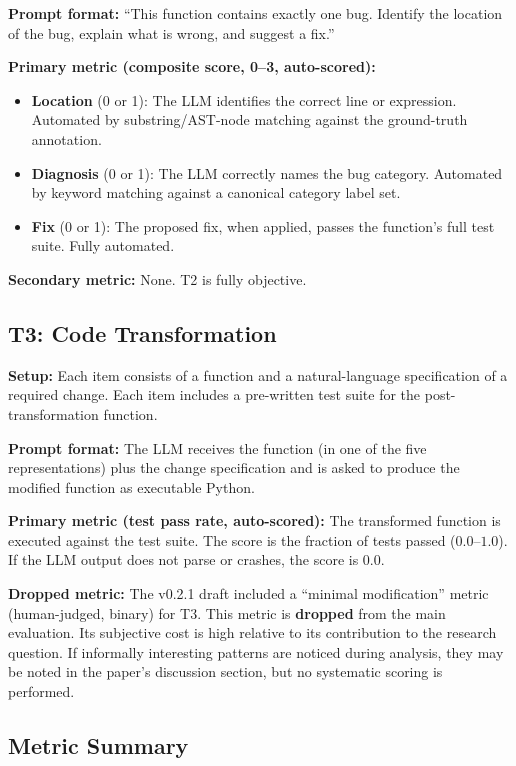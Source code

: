 \documentclass[11pt]{article}
\begin{document}
\textbf{Prompt format:}  ``This function contains exactly one bug.
Identify the location of the bug, explain what is wrong, and suggest a
fix.''

\textbf{Primary metric (composite score, 0--3, auto-scored):}
\begin{itemize}[nosep]
  \item \textbf{Location} (0 or 1): The LLM identifies the correct
        line or expression.  Automated by substring/AST-node matching
        against the ground-truth annotation.
  \item \textbf{Diagnosis} (0 or 1): The LLM correctly names the bug
        category.  Automated by keyword matching against a canonical
        category label set.
  \item \textbf{Fix} (0 or 1): The proposed fix, when applied, passes
        the function's full test suite.  Fully automated.
\end{itemize}

\textbf{Secondary metric:}  None.  T2 is fully objective.

\subsection*{T3: Code Transformation}

\textbf{Setup:}  Each item consists of a function and a
natural-language specification of a required change.  Each item
includes a pre-written test suite for the post-transformation
function.

\textbf{Prompt format:}  The LLM receives the function (in one of the
five representations) plus the change specification and is asked to
produce the modified function as executable Python.

\textbf{Primary metric (test pass rate, auto-scored):}  The
transformed function is executed against the test suite.  The score is
the fraction of tests passed ($0.0$--$1.0$).  If the LLM output does
not parse or crashes, the score is $0.0$.

\textbf{Dropped metric:}  The v0.2.1 draft included a ``minimal
modification'' metric (human-judged, binary) for T3.  This metric is
\textbf{dropped} from the main evaluation.  Its subjective cost is
high relative to its contribution to the research question.  If
informally interesting patterns are noticed during analysis, they may
be noted in the paper's discussion section, but no systematic scoring
is performed.

\subsection*{Metric Summary}
\end{document}
